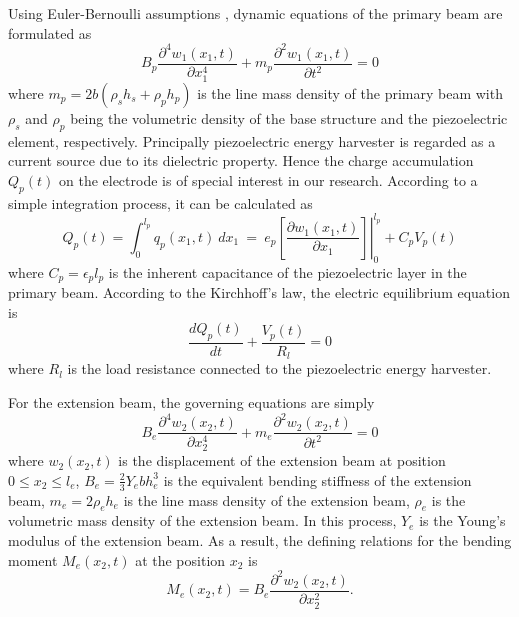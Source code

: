 \documentclass{elsarticle}
\begin{document}
Using Euler-Bernoulli assumptions \cite{Timoshenko1974Vibration}, dynamic equations of the primary beam are formulated as 
\begin{equation}
    B_p \frac{\partial^4 w_1(x_1,t)}{\partial x_1^4} + m_p \frac{\partial^2 w_1(x_1,t)}{\partial t^2} = 0
    \label{eq:eq_primary_beam_equilibrium_equation}
\end{equation}
where $m_p = 2 b(\rho_s h_s + \rho_p h_p)$ is the line mass density of the primary beam with $\rho_s$ and $\rho_p$ being the volumetric density of the base structure and the piezoelectric element, respectively. Principally piezoelectric energy harvester is regarded as a current source due to its dielectric property. Hence the charge accumulation $Q_p(t)$ on the electrode  is of special interest in our research. According to a simple integration process, it can be calculated as 
\begin{equation}
    Q_p(t) = \int_0^{l_p} q_p(x_1, t)\ d x_1\ = \ e_p \left.\left[ \frac{\partial w_1(x_1,t)}{\partial x_1} \right]\right|^{l_p}_0 + C_p V_p (t)
    \label{eq:eq_primary_beam_charge_accumulation}
\end{equation}
where $C_p = \epsilon_p l_p$ is the inherent capacitance of the piezoelectric layer in the primary beam. According to the Kirchhoff's law, the electric equilibrium equation is 
\begin{equation}
    \frac{d Q_p(t)}{dt}  + \frac{V_p(t)}{R_l} = 0
    \label{eq:eq_primary_beam_circuit_equation}
\end{equation}
where $R_l$ is the load resistance connected to the piezoelectric energy harvester.

For the extension beam, the governing equations are simply
\begin{equation}
    B_e \frac{\partial^4 w_2(x_2,t)}{\partial x_2^4} + m_e \frac{\partial^2 w_2(x_2,t)}{\partial t^2} = 0
    \label{eq:eq_extension_beam_equilibrium_equation}
\end{equation}
where $w_2(x_2,t)$ is the displacement of the extension beam at position $0\leq x_2 \leq l_e$, $B_e = \frac{2}{3} Y_e b h_e^3$ is the equivalent bending stiffness of the extension beam, $m_e = 2\rho_e h_e$ is the line mass density of the extension beam, $\rho_e$ is the volumetric mass density of the extension beam. In this process, $Y_e$ is the Young's modulus of the extension beam. As a result, the defining relations for the bending moment $M_e(x_2,t)$ at the position $x_2$ is
\begin{equation}
    M_e(x_2,t) = B_e \frac{\partial^2 w_2(x_2,t)}{\partial x_2^2}.
    \label{eq:eq_extension_beam_consitution_equation}
\end{equation}
\end{document}

